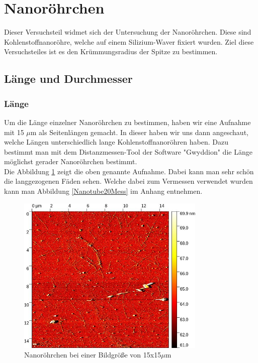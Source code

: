 

\section{Nanoröhrchen}
Dieser Versuchsteil widmet sich der Untersuchung der Nanoröhrchen. Diese sind Kohlenstoffnanoröhre, welche auf einem Silizium-Waver 
fixiert wurden. Ziel diese Versuchsteiles ist es den Krümmungsradius der Spitze zu bestimmen.
\subsection{Länge und Durchmesser}
\subsubsection*{Länge}
Um die Länge einzelner Nanoröhrchen zu bestimmen, haben wir eine Aufnahme mit 15 $\mu$m als Seitenlängen gemacht. In dieser haben wir uns 
dann angeschaut, welche Längen unterschiedlich lange Kohlenstoffnanoröhren haben. Dazu bestimmt man mit dem Distanzmessen-Tool der Software 
"Gwyddion" \footnotemark {} die Länge möglichst gerader Nanoröhrchen bestimmt. \\
Die Abbildung \ref{Nanotube20} zeigt die oben genannte Aufnahme. Dabei kann man sehr schön die langgezogenen Fäden sehen. Welche dabei zum Vermessen verwendet wurden 
kann man Abbildung \ref{Nanotube20Mess} im Anhang entnehmen.

\begin{figure}[h]
    \centering
    \includegraphics[width = 9cm]{Bilder/Nanotubes/NanoTube15um.jpg}
    \caption{Nanoröhrchen bei einer Bildgröße von 15x15$\mu$m}
    \label{Nanotube20}
\end{figure}

